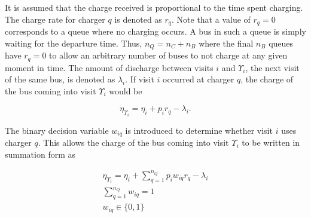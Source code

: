 \documentclass[utf8]{FrontiersinHarvard}
\begin{document}

It is assumed that the charge received is proportional to the time spent charging. The charge rate for charger $q$ is
denoted as $r_q$. Note that a value of $r_q = 0$ corresponds to a queue where no charging occurs. A bus in such a queue
is simply waiting for the departure time. Thus, $n_Q = n_C + n_B$ where the final $n_B$ queues have $r_q = 0$ to allow
an arbitrary number of buses to not charge at any given moment in time. The amount of discharge between visits $i$ and
$\Upsilon_i$, the next visit of the same bus, is denoted as $\lambda_i$. If visit $i$ occurred at charger $q$, the charge of the bus
coming into visit $\Upsilon_i$ would be

\begin{equation}
	\eta_{\Upsilon_i} = \eta_i + p_i r_q - \lambda_i.
\end{equation}

The binary decision variable $w_{iq}$ is introduced to determine whether visit $i$ uses charger $q$. This allows the
charge of the bus coming into visit $\Upsilon_i$ to be written in summation form as

\begin{subequations}
    \label{subeq:pre_next_charge}
\begin{align}
    \eta_{\Upsilon_i} = \eta_i + \sum_{q=1}^{n_Q} p_i w_{iq} r_q - \lambda_i  \\
    \sum_{q=1}^{n_Q} w_{iq} = 1 \\
    w_{iq} \in \{0,1\}
\end{align}
\end{subequations}
\end{document}
